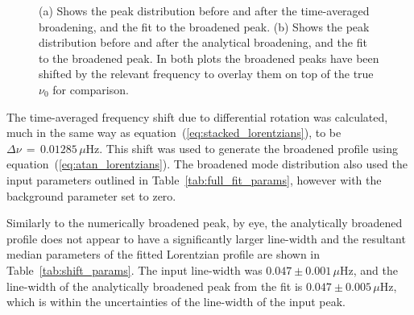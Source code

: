 \begin{figure}[ht!]
	\centering
	\qquad
	\caption{(a) Shows the peak distribution before and after the time-averaged broadening, and the fit to the broadened peak. (b) Shows the peak distribution before and after the analytical broadening, and the fit to the broadened peak. In both plots the broadened peaks have been shifted by the relevant frequency to overlay them on top of the true $\nu_0$ for comparison.} \label{fig:shifted_peaks}
\end{figure}



The time-averaged frequency shift due to differential rotation was calculated, much in the same way as equation~(\ref{eq:stacked_lorentzians}), to be $\Delta\nu \, = \,0.01285 \, \mu\mathrm{Hz}$. This shift was used to generate the broadened profile using equation~(\ref{eq:atan_lorentzians}).  The broadened mode distribution also used the input parameters outlined in Table~\ref{tab:full_fit_params}, however with the background parameter set to zero.

Similarly to the numerically broadened peak, by eye, the analytically broadened profile does not appear to have a significantly larger line-width and the resultant median parameters of the fitted Lorentzian profile are shown in Table~\ref{tab:shift_params}. The input line-width was $0.047 \pm 0.001 \, \mu\mathrm{Hz} $, and the line-width of the analytically broadened peak from the fit is $0.047 \pm 0.005 \, \mu\mathrm{Hz} $, which is within the uncertainties of the line-width of the input peak.

